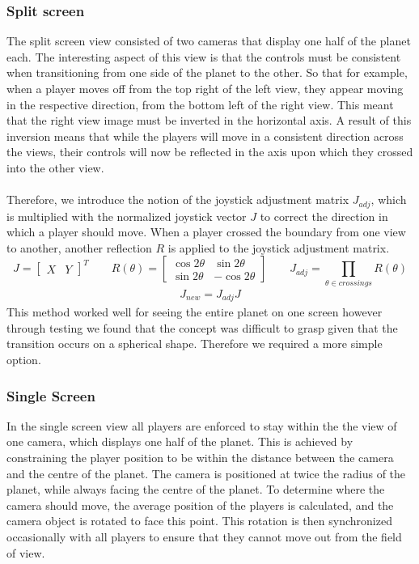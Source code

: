 \documentclass[11pt,a4paper]{article}
\begin{document}
   \subsubsection{Split screen} 
   
   The split screen view consisted of two cameras that display one half of the planet each. The interesting aspect of this view is that the controls must be consistent when transitioning from one side of the planet to the other. So that for example, when a player moves off from the top right of the left view, they appear moving in the respective direction, from the bottom left of the right view. This meant that the right view image must be inverted in the horizontal axis. A result of this inversion means that while the players will move in a consistent direction across the views, their controls will now be reflected in the axis upon which they crossed into the other view. \\ \\
   Therefore, we introduce the notion of the joystick adjustment matrix $J_{adj}$, which is multiplied with the normalized joystick vector $J$ to correct the direction in which a player should move. When a player crossed the boundary from one view to another, another reflection $R$ is applied to the joystick adjustment matrix. 
  \begin{equation}
     J=\begin{bmatrix}
         X & Y
        \end{bmatrix}^{T}
        \qquad
          R(\theta) = 
          \begin{bmatrix}
          \cos {2\theta} & \sin {2\theta} \\
          \sin {2\theta} & -\cos {2\theta}
          \end{bmatrix}
      \qquad
      J_{adj} = \prod_{\theta \in crossings}R({\theta})
  \end{equation}
  \begin{align*}
    J_{new} = J_{adj}J
  \end{align*}
  This method worked well for seeing the entire planet on one screen however through testing we found that the concept was difficult to grasp given that the transition occurs on a spherical shape. Therefore we required a more simple option.

\pagebreak
   \subsubsection{Single Screen}
    In the single screen view all players are enforced to stay within the the view of one camera, which displays one half of the planet. This is achieved by constraining the player position to be within the distance between the camera and the centre of the planet. The camera is positioned at twice the radius of the planet, while always facing the centre of the planet. To determine where the camera should move, the average position of the players is calculated, and the camera object is rotated to face this point. This rotation is then synchronized occasionally with all players to ensure that they cannot move out from the field of view. \\ \\
\end{document}
